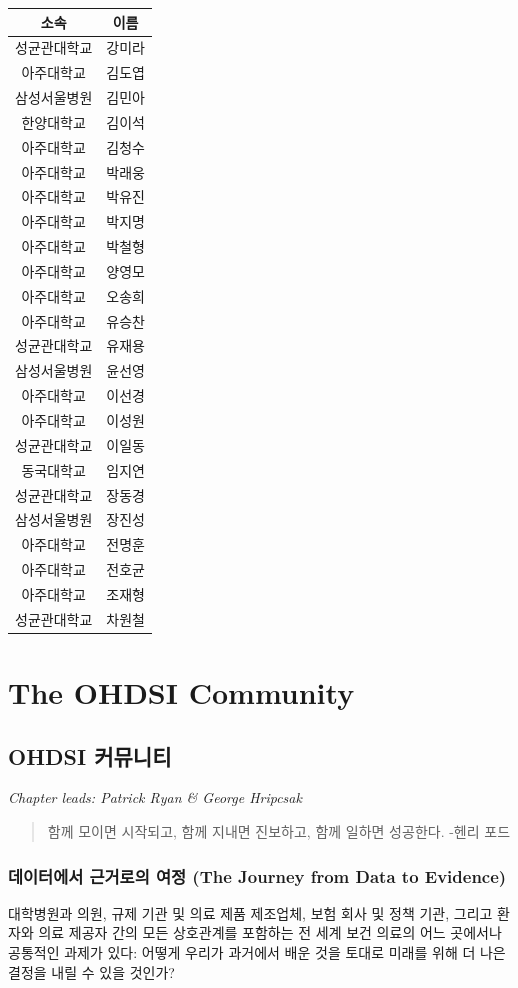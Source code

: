 \documentclass[11pt]{book}
\theoremstyle{definition}
\theoremstyle{definition}
\theoremstyle{definition}
\theoremstyle{remark}
\begin{document}
\begin{longtable}[]{@{}cc@{}}
\toprule
소속 & 이름\tabularnewline
\midrule
\endhead
성균관대학교 & 강미라\tabularnewline
아주대학교 & 김도엽\tabularnewline
삼성서울병원 & 김민아\tabularnewline
한양대학교 & 김이석\tabularnewline
아주대학교 & 김청수\tabularnewline
아주대학교 & 박래웅\tabularnewline
아주대학교 & 박유진\tabularnewline
아주대학교 & 박지명\tabularnewline
아주대학교 & 박철형\tabularnewline
아주대학교 & 양영모\tabularnewline
아주대학교 & 오송희\tabularnewline
아주대학교 & 유승찬\tabularnewline
성균관대학교 & 유재용\tabularnewline
삼성서울병원 & 윤선영\tabularnewline
아주대학교 & 이선경\tabularnewline
아주대학교 & 이성원\tabularnewline
성균관대학교 & 이일동\tabularnewline
동국대학교 & 임지연\tabularnewline
성균관대학교 & 장동경\tabularnewline
삼성서울병원 & 장진성\tabularnewline
아주대학교 & 전명훈\tabularnewline
아주대학교 & 전호균\tabularnewline
아주대학교 & 조재형\tabularnewline
성균관대학교 & 차원철\tabularnewline
\bottomrule
\end{longtable}

\mainmatter

\part{The OHDSI Community}\label{part-the-ohdsi-community}

\chapter{OHDSI 커뮤니티}\label{OhdsiCommunity}

\emph{Chapter leads: Patrick Ryan \& George Hripcsak}

\begin{quote}
함께 모이면 시작되고, 함께 지내면 진보하고, 함께 일하면 성공한다. -헨리
포드
\end{quote}

\section{데이터에서 근거로의 여정 (The Journey from Data to
Evidence)}\label{---the-journey-from-data-to-evidence}

대학병원과 의원, 규제 기관 및 의료 제품 제조업체, 보험 회사 및 정책
기관, 그리고 환자와 의료 제공자 간의 모든 상호관계를 포함하는 전 세계
보건 의료의 어느 곳에서나 공통적인 과제가 있다: 어떻게 우리가 과거에서
배운 것을 토대로 미래를 위해 더 나은 결정을 내릴 수 있을 것인가?
\end{document}
